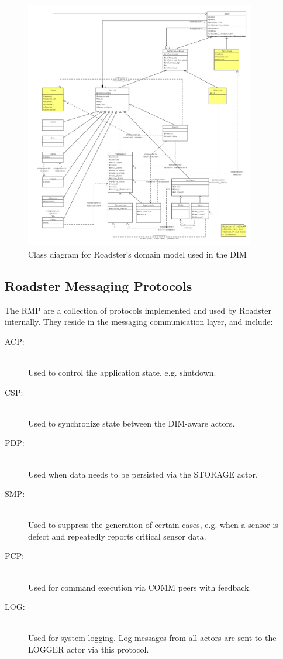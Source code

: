 \begin{figure}[]
	\includegraphics[trim=1.5cm 1cm 1cm 1cm, clip=true, width=0.9\textwidth]{img/meta_model.pdf}
	\caption{Class diagram for Roadster's domain model used in the DIM}
	\label{fig:roadster:meta-model}
\end{figure}


\subsection{Roadster Messaging Protocols}\label{sec:rmp}
The \gls{RMP} are a collection of protocols implemented and used by Roadster
internally. They reside in the messaging communication layer, and include:

\begin{description}
	\item [\gls{ACP}:]\hfill\\
		Used to control the application state, e.g. shutdown.
	\item [\gls{CSP}:]\hfill\\
		Used to synchronize state between the DIM-aware actors.
	\item [\gls{PDP}:]\hfill\\
		Used when data needs to be persisted via the STORAGE actor.
	\item [\gls{SMP}:]\hfill\\
		Used to suppress the generation of certain \glspl{case}, e.g.
		when a sensor is defect and repeatedly reports critical sensor data.
	\item [\gls{PCP}:]\hfill\\
		Used for command execution via COMM peers with feedback.
	\item [\gls{LOG}:]\hfill\\
		Used for system logging. Log messages from all actors are sent
		to the LOGGER actor via this protocol.
\end{description}


